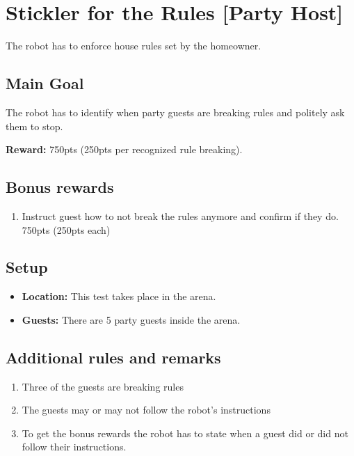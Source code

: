 \section{Stickler for the Rules [Party Host]}
The robot has to enforce house rules set by the homeowner.


\subsection{Main Goal}
The robot has to identify when party guests are breaking rules and politely ask them to stop.

\noindent\textbf{Reward:} 750pts (250pts per recognized rule breaking).

\subsection{Bonus rewards}
\begin{enumerate}[nosep]
	\item Instruct guest how to not break the rules anymore and confirm if they do. 750pts (250pts each)
\end{enumerate}

\subsection{Setup}
\begin{itemize}[nosep]
	\item \textbf{Location:} This test takes place in the arena.
	\item \textbf{Guests:} There are 5 party guests inside the arena.
\end{itemize}


\subsection{Additional rules and remarks}
\begin{enumerate}[nosep]
	\item Three of the guests are breaking rules
	\item The guests may or may not follow the robot's instructions
	\item To get the bonus rewards the robot has to state when a guest did or did not follow their instructions.
\end{enumerate}

